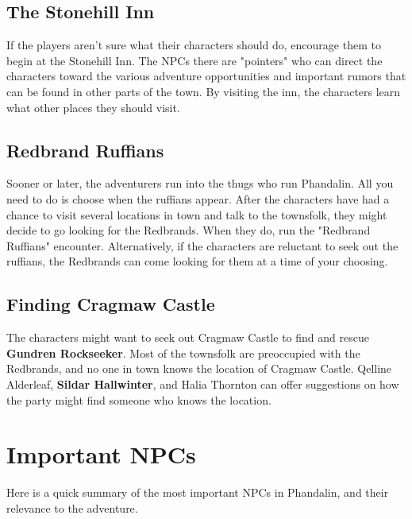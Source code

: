 \documentclass[10pt,a4paper,twoside,bg=print,twocolumn,openany,nodeprecatedcode]{dndbook}
\begin{document}
\subsection{The Stonehill Inn}
If the players aren't sure what their characters should do, encourage them to begin at the Stonehill Inn. The NPCs there are "pointers" who can direct the characters toward the various adventure opportunities and important rumors that can be found in other parts of the town. By visiting the inn, the characters learn what other places they should visit.

\subsection{Redbrand Ruffians}
Sooner or later, the adventurers run into the thugs who run Phandalin. All you need to do is choose when the ruffians appear. After the characters have had a chance to visit several locations in town and talk to the townsfolk, they might decide to go looking for the Redbrands. When they do, run the "Redbrand Ruffians" encounter. Alternatively, if the characters are reluctant to seek out the ruffians, the Redbrands can come looking for them at a time of your choosing.

\subsection{Finding Cragmaw Castle}
The characters might want to seek out Cragmaw Castle to find and rescue \textbf{Gundren Rockseeker}. Most of the townsfolk are preoccupied with the Redbrands, and no one in town knows the location of Cragmaw Castle. Qelline Alderleaf, \textbf{Sildar Hallwinter}, and Halia Thornton can offer suggestions on how the party might find someone who knows the location.

\section{Important NPCs}
Here is a quick summary of the most important NPCs in Phandalin, and their relevance to the adventure.
\end{document}
